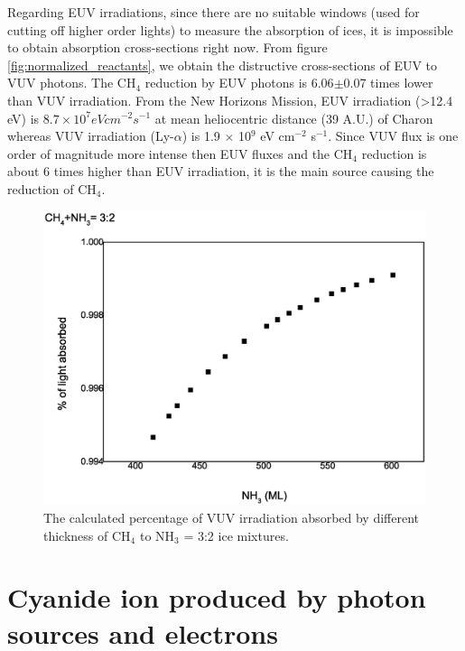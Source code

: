 Regarding EUV irradiations, since there are no suitable windows (used for cutting off higher order lights) to measure the absorption of ices, it is impossible to obtain absorption cross-sections right now. From figure \ref{fig:normalized_reactants}, we obtain the distructive cross-sections of EUV to VUV photons. The CH$_4$ reduction by EUV photons is 6.06$\pm$0.07 times lower than VUV irradiation.  From the New Horizons Mission, EUV irradiation (>12.4 eV) is $8.7 \times 10^7 eV cm^{-2} s^{-1}$ at mean heliocentric distance (39 A.U.) of Charon whereas VUV irradiation (Ly-$\alpha$) is 1.9 $\times$ 10$^9$ eV cm$^{-2}$ s$^{-1}$\cite{grundy2016formation}. Since VUV flux is one order of magnitude more intense then EUV fluxes and the CH$_4$ reduction is about 6 times higher than EUV irradiation, it is the main source causing the reduction of CH$_4$.

\begin{figure}
\centering
\includegraphics[width=\textwidth]{figures/chapter4/absorption.eps}
\caption{The calculated percentage of VUV irradiation absorbed by different thickness of CH$_4$ to NH$_3$ = 3:2 ice mixtures.}
\label{fig:absorption_percentage}
\end{figure}

\section{Cyanide ion produced by photon sources and electrons} %

